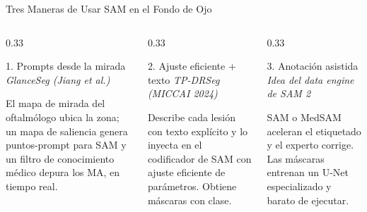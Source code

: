 \documentclass[aspectratio=169, 10pt]{beamer}
\begin{document}
\begin{frame}{Tres Maneras de Usar SAM en el Fondo de Ojo}

	\begin{columns}[T]
		\begin{column}{0.33\textwidth}
			\begin{block}{1. Prompts desde la mirada}
				\small
				\textit{GlanceSeg (Jiang et al.)}

				\vspace{0.1cm}
				El mapa de mirada del oftalm\'ologo ubica la zona; un mapa de saliencia genera puntos-prompt para SAM y un filtro de conocimiento m\'edico depura los MA, en tiempo real.
			\end{block}
		\end{column}

		\begin{column}{0.33\textwidth}
			\begin{block}{2. Ajuste eficiente + texto}
				\small
				\textit{TP-DRSeg (MICCAI 2024)}

				\vspace{0.1cm}
				Describe cada lesi\'on con texto expl\'icito y lo inyecta en el codificador de SAM con ajuste eficiente de par\'ametros. Obtiene m\'ascaras con clase.
			\end{block}
		\end{column}

		\begin{column}{0.33\textwidth}
			\begin{block}{3. Anotaci\'on asistida}
				\small
				\textit{Idea del data engine de SAM 2}

				\vspace{0.1cm}
				SAM o MedSAM aceleran el etiquetado y el experto corrige. Las m\'ascaras entrenan un U-Net especializado y barato de ejecutar.
			\end{block}
		\end{column}
	\end{columns}

\end{frame}
\end{document}
